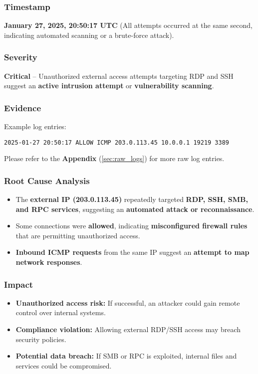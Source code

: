 \documentclass[11pt]{article}
\begin{document}
\subsubsection{Timestamp}
\textbf{January 27, 2025, 20:50:17 UTC} (All attempts occurred at the same second, indicating automated scanning or a brute-force attack).

\subsubsection{Severity}
\textbf{Critical} – Unauthorized external access attempts targeting RDP and SSH suggest an \textbf{active intrusion attempt} or \textbf{vulnerability scanning}.

\subsubsection{Evidence}
Example log entries:
\begin{verbatim}
2025-01-27 20:50:17 ALLOW ICMP 203.0.113.45 10.0.0.1 19219 3389   
\end{verbatim}
Please refer to the \textbf{Appendix} (\ref{sec:raw_logs}) for more raw log entries.

\subsubsection{Root Cause Analysis}
\begin{itemize}
    \item The \textbf{external IP (203.0.113.45)} repeatedly targeted \textbf{RDP, SSH, SMB, and RPC services}, suggesting an \textbf{automated attack or reconnaissance}.
    \item Some connections were \textbf{allowed}, indicating \textbf{misconfigured firewall rules} that are permitting unauthorized access.
    \item \textbf{Inbound ICMP requests} from the same IP suggest an \textbf{attempt to map network responses}.
\end{itemize}

\subsubsection{Impact}
\begin{itemize}
    \item \textbf{Unauthorized access risk:} If successful, an attacker could gain remote control over internal systems.
    \item \textbf{Compliance violation:} Allowing external RDP/SSH access may breach security policies.
    \item \textbf{Potential data breach:} If SMB or RPC is exploited, internal files and services could be compromised.
\end{itemize}
\end{document}
